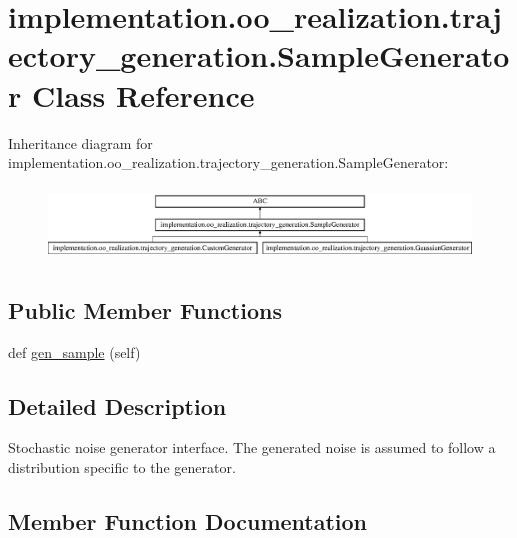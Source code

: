 \hypertarget{classimplementation_1_1oo__realization_1_1trajectory__generation_1_1_sample_generator}{}\section{implementation.\+oo\+\_\+realization.\+trajectory\+\_\+generation.\+Sample\+Generator Class Reference}
\label{classimplementation_1_1oo__realization_1_1trajectory__generation_1_1_sample_generator}
Inheritance diagram for implementation.\+oo\+\_\+realization.\+trajectory\+\_\+generation.\+Sample\+Generator\+:\begin{figure}[H]
\begin{center}
\leavevmode
\includegraphics[height=1.985816cm]{classimplementation_1_1oo__realization_1_1trajectory__generation_1_1_sample_generator}
\end{center}
\end{figure}
\subsection*{Public Member Functions}
\begin{DoxyCompactItemize}
\item 
def \hyperlink{classimplementation_1_1oo__realization_1_1trajectory__generation_1_1_sample_generator_a12fca5c4e717f81e111ee50736f44334}{gen\+\_\+sample} (self)
\end{DoxyCompactItemize}


\subsection{Detailed Description}
\begin{DoxyVerb}Stochastic noise generator interface.
The generated noise is assumed to follow a distribution specific to the generator.
\end{DoxyVerb}
 

\subsection{Member Function Documentation}
\mbox{\label{classimplementation_1_1oo__realization_1_1trajectory__generation_1_1_sample_generator_a12fca5c4e717f81e111ee50736f44334}} 
